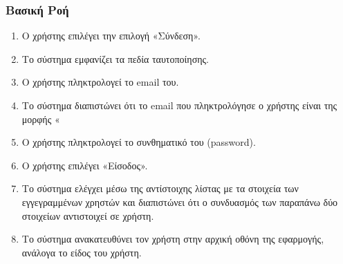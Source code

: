 \documentclass[12pt,a4paper,twoside]{book}
\begin{document}
\subsubsection{Βασική Ροή}
\begin{enumerate}
  \item Ο χρήστης επιλέγει την επιλογή «Σύνδεση». %
  \item Το σύστημα εμφανίζει τα πεδία ταυτοποίησης. %
  \item Ο χρήστης πληκτρολογεί το email του.  %
  \item Το σύστημα διαπιστώνει ότι το email που πληκτρολόγησε ο χρήστης είναι της μορφής «%
  \item Ο χρήστης πληκτρολογεί το συνθηματικό του (password). %
  \item Ο χρήστης επιλέγει «Είσοδος». %
  \item Το σύστημα ελέγχει μέσω της αντίστοιχης λίστας με τα στοιχεία των εγγεγραμμένων χρηστών και διαπιστώνει ότι ο συνδυασμός των παραπάνω δύο στοιχείων αντιστοιχεί σε χρήστη. %
  \item Το σύστημα ανακατευθύνει τον χρήστη στην αρχική οθόνη της εφαρμογής, ανάλογα το είδος του χρήστη. %
\end{enumerate}
\end{document}
